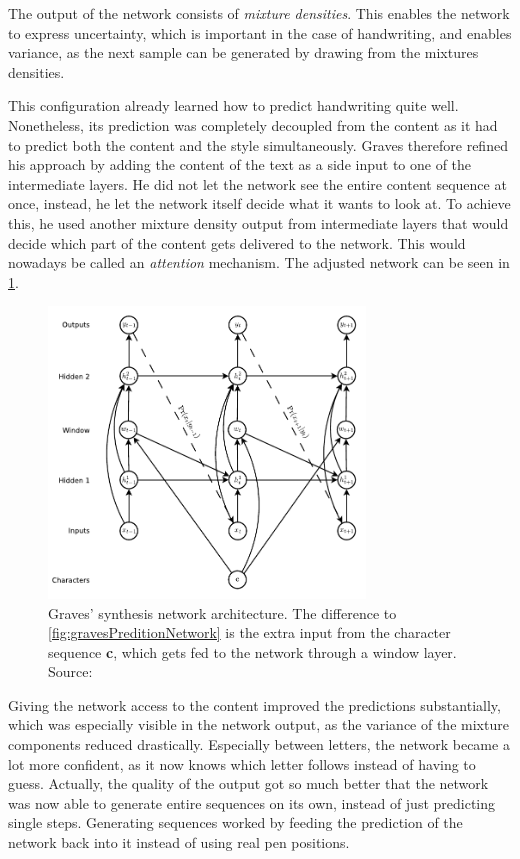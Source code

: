 The output of the network consists of \emph{mixture densities}. This enables the network to express uncertainty, which is important in the case of handwriting, and enables variance, as the next sample can be generated by drawing from the mixtures densities.

This configuration already learned how to predict handwriting quite well. Nonetheless, its prediction was completely decoupled from the content as it had to predict both the content and the style simultaneously. Graves therefore refined his approach by adding the content of the text as a side input to one of the intermediate layers. He did not let the network see the entire content sequence at once, instead, he let the network itself decide what it wants to look at. To achieve this, he used another mixture density output from intermediate layers that would decide which part of the content gets delivered to the network. This would nowadays be called an \emph{attention} mechanism. The adjusted network can be seen in \cref{fig:gravesSynthesisNetwork}.


\begin{figure}
  \centering
  \includegraphics[width=0.75\textwidth]{../assets/style_transfer/graves_synthesis_network.pdf}
  \caption[Graves' synthesis network architecture]{Graves' synthesis network architecture. The difference to \cref{fig:gravesPreditionNetwork} is the extra input from the character sequence \textbf{c}, which gets fed to the network through a window layer. Source:~\cite{graves}}
  \label{fig:gravesSynthesisNetwork}
\end{figure}

Giving the network access to the content improved the predictions substantially, which was especially visible in the network output, as the variance of the mixture components reduced drastically. Especially between letters, the network became a lot more confident, as it now knows which letter follows instead of having to guess. Actually, the quality of the output got so much better that the network was now able to generate entire sequences on its own, instead of just predicting single steps. Generating sequences worked by feeding the prediction of the network back into it instead of using real pen positions.

